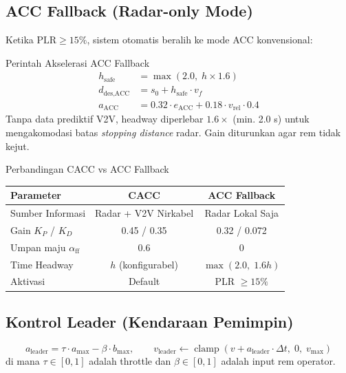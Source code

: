 \documentclass[12pt,a4paper]{article}
\begin{document}
\subsection{ACC Fallback (Radar-only Mode)}

Ketika $\text{PLR} \geq 15\%$, sistem otomatis beralih ke mode ACC konvensional:

\begin{formulabox}{Perintah Akselerasi ACC Fallback}
\begin{align}
  h_{\text{safe}} &= \max(2.0,\; h \times 1.6) \label{eq:acc_h}\\[4pt]
  d_{\text{des,ACC}} &= s_0 + h_{\text{safe}} \cdot v_f \label{eq:acc_d}\\[4pt]
  a_{\text{ACC}} &= 0.32 \cdot e_{\text{ACC}} + 0.18 \cdot v_{\text{rel}} \cdot 0.4 \label{eq:acc_a}
\end{align}
Tanpa data prediktif V2V, headway diperlebar $1.6\times$ (min. 2.0 s) untuk mengakomodasi
batas \textit{stopping distance} radar. Gain diturunkan agar rem tidak kejut.
\end{formulabox}

\begin{infobox}{Perbandingan CACC vs ACC Fallback}
\begin{center}
\begin{tabular}{lcc}
\toprule
\textbf{Parameter} & \textbf{CACC} & \textbf{ACC Fallback} \\
\midrule
Sumber Informasi & Radar + V2V Nirkabel & Radar Lokal Saja \\
Gain $K_P$ / $K_D$ & 0.45 / 0.35 & 0.32 / 0.072 \\
Umpan maju $\alpha_{\text{ff}}$ & 0.6 & 0 \\
Time Headway & $h$ (konfigurabel) & $\max(2.0,\; 1.6h)$ \\
Aktivasi & Default & PLR $\geq 15\%$ \\
\bottomrule
\end{tabular}
\end{center}
\end{infobox}

\subsection{Kontrol Leader (Kendaraan Pemimpin)}

\begin{equation}
  a_{\text{leader}} = \tau \cdot a_{\max} - \beta \cdot b_{\max}, \qquad
  v_{\text{leader}} \leftarrow \operatorname{clamp}(v + a_{\text{leader}} \cdot \Delta t,\; 0,\; v_{\max})
\end{equation}
di mana $\tau \in [0,1]$ adalah throttle dan $\beta \in [0,1]$ adalah input rem operator.
\end{document}
